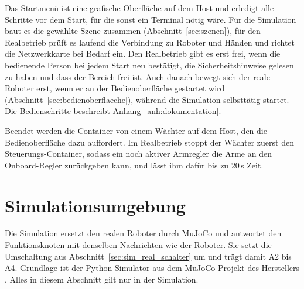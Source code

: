 Das Startmenü ist eine grafische Oberfläche auf dem Host und erledigt alle Schritte vor dem Start, für die sonst ein Terminal nötig wäre.
Für die Simulation baut es die gewählte Szene zusammen (Abschnitt~\ref{sec:szenen}), für den Realbetrieb prüft es laufend die Verbindung zu Roboter und Händen und richtet die Netzwerkkarte bei Bedarf ein.
Den Realbetrieb gibt es erst frei, wenn die bedienende Person bei jedem Start neu bestätigt, die Sicherheitshinweise gelesen zu haben und dass der Bereich frei ist.
Auch danach bewegt sich der reale Roboter erst, wenn er an der Bedienoberfläche gestartet wird (Abschnitt~\ref{sec:bedienoberflaeche}), während die Simulation selbsttätig startet.
Die Bedienschritte beschreibt Anhang~\ref{anh:dokumentation}.

Beendet werden die Container von einem Wächter auf dem Host, den die Bedienoberfläche dazu auffordert.
Im Realbetrieb stoppt der Wächter zuerst den Steuerungs-Container, sodass ein noch aktiver Armregler die Arme an den Onboard-Regler zurückgeben kann, und lässt ihm dafür bis zu 20\,s Zeit.

\section{Simulationsumgebung}
\label{sec:simulationsumgebung}
Die Simulation ersetzt den realen Roboter durch MuJoCo und antwortet den Funktionsknoten mit denselben Nachrichten wie der Roboter.
Sie setzt die Umschaltung aus Abschnitt~\ref{sec:sim_real_schalter} um und trägt damit A2 bis A4.
Grundlage ist der Python-Simulator aus dem MuJoCo-Projekt des Herstellers \cite{UnitreeMujoco}.
Alles in diesem Abschnitt gilt nur in der Simulation.

